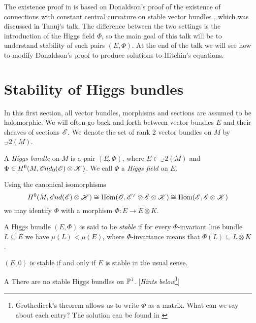\documentclass[A4paper, 12pt, british, reqno]{amsart}
\DeclareMathOperator{\Hom}{Hom}
\newcommand{\ot}{\otimes}
\newcommand{\dual}{^{\vee}}
\newcommand{\1}{\mathbbm{1}}
\begin{document}
The existence proof in \cite[(4.3)]{hit87a} is based on Donaldson's proof of the existence of connections with constant central curvature on stable vector bundles \cite{don83}, which was discussed in Tanuj's talk.
The difference between the two settings is the introduction of the Higgs field $\Phi$, so the main goal of this talk will be to understand stability of such pairs $(E,\Phi)$.
At the end of the talk we will see how to modify Donaldson's proof to produce solutions to Hitchin's equations.

\section{Stability of Higgs bundles}

\begin{unota}
    In this first section, all vector bundles, morphisms and sections are assumed to be holomorphic.
    We will often go back and forth between vector bundles $E$ and their sheaves of sections $\E$.
    We denote the set of rank $2$ vector bundles on $M$ by $\Vec_{2}(M)$.
\end{unota}

\begin{udefn}
    A \textit{Higgs bundle} on $M$ is a pair $(E,\Phi)$, where $E\in \Vec_{2}(M)$ and $\Phi\in H^{0}(M,\sEnd_{0}(\E)\ot \sK)$.
    We call $\Phi$ a \textit{Higgs field} on $E$.
\end{udefn}

\begin{urem}
    Using the canonical isomorphisms
    \[ H^{0}(M,\sEnd(\E)\ot \sK)\cong \Hom(\O,\E\dual \ot \E\ot \sK)\cong \Hom(\E,\E\ot \sK) \]
    we may identify $\Phi$ with a morphism $\Phi\colon E\to E\ot K$.
\end{urem}

\begin{udefn}[Stability]
    A Higgs bundle $(E,\Phi)$ is said to be \textit{stable} if for every $\Phi$-invariant line bundle $L\subseteq E$ we have $\mu(L)<\mu(E)$, where $\Phi$-invariance means that $\Phi(L)\subseteq L\ot K$.
\end{udefn}

\begin{urem}
    $(E,0)$ is stable if and only if $E$ is stable in the usual sense.
\end{urem}

\begin{cexe}{A}
    There are no stable Higgs bundles on $\P^{1}$.
    [\textit{Hints below}\footnote{Grothedieck's theorem allows us to write $\Phi$ as a matrix.
    What can we say about each entry?
    The solution can be found in \cite[(3.2) (iii)]{hit87a}}]
\end{cexe}
\end{document}
